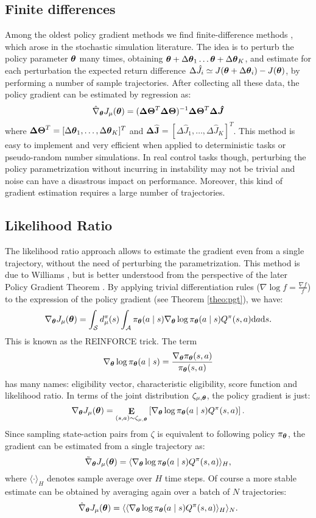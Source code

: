\subsection{Finite differences}
Among the oldest policy gradient methods we find finite-difference methods \cite{Glynn:1990:LRG:84537.84552}, which arose in the stochastic simulation literature. The idea is to perturb the policy parameter $\boldsymbol{\theta}$ many times, obtaining $\boldsymbol{\theta}+\Delta\boldsymbol{\theta}_1 \dots \boldsymbol{\theta}+\Delta\boldsymbol{\theta}_K$, and estimate for each perturbation the expected return difference $\Delta\hat{J}_i \simeq J(\boldsymbol{\theta}+\Delta\boldsymbol{\theta}_i) - J(\boldsymbol{\theta})$, by performing a number of sample trajectories. After collecting all these data, the policy gradient can be estimated by regression as:
\[
	\hat{\nabla}_{\boldsymbol{\theta}}J_{\mu}(\boldsymbol{\theta}) = (\boldsymbol{\Delta\Theta}^T\boldsymbol{\Delta\Theta})^{-1}\boldsymbol{\Delta\Theta}^T\boldsymbol{\Delta\hat{J}}
\]
where $\boldsymbol{\Delta\Theta}^T = [\Delta\boldsymbol{\theta}_1,\dots,\Delta\boldsymbol{\theta}_K]^T$ and $\boldsymbol{\Delta\hat{J}} = [\Delta\hat{J}_1,\dots,\Delta\hat{J}_K]^T$. This method is easy to implement and very efficient when applied to deterministic tasks or pseudo-random number simulations. In real control tasks though, perturbing the policy parametrization without incurring in instability may not be trivial and noise can have a disastrous impact on performance. Moreover, this kind of gradient estimation requires a large number of trajectories.

\subsection{Likelihood Ratio}\label{sec:likelihood_ratio}
The likelihood ratio approach allows to estimate the gradient even from a single trajectory, without the need of perturbing the parametrization. This method is due to Williams \cite{Williams1992}, but is better understood from the perspective of the later Policy Gradient Theorem \cite{Sutton1999a}.
By applying trivial differentiation rules ($\nabla\log f = \frac{\nabla f}{f}$) to the expression of the policy gradient (see Theorem \ref{theo:pgt}), we have:
\[
	\nabla_{\boldsymbol{\theta}}J_\mu(\boldsymbol{\theta}) = \int_{\mathcal{S}}d_{\mu}^{\pi}(s)
		\int_{\mathcal{A}}\pi_{\boldsymbol{\theta}}(a \mid s)\nabla_{\boldsymbol{\theta}}\log\pi_{\boldsymbol{\theta}}(a \mid s)
		Q^{\pi}(s,a)\mathrm{d}a\mathrm{d}s.
\]
This is known as the REINFORCE \cite{Williams1992} trick. The term
\[
	\nabla_{\boldsymbol{\theta}}\log\pi_{\boldsymbol{\theta}}(a \mid s) = \frac{\nabla_{\boldsymbol{\theta}}\pi_{\boldsymbol{\theta}}(s,a)}{\pi_{\boldsymbol{\theta}}(s,a)}
\]
has many names: eligibility vector, characteristic eligibility, score function and likelihood ratio.
In terms of the joint distribution $\zeta_{\mu,\boldsymbol{\theta}}$, the policy gradient is just:
\[
	\nabla_{\boldsymbol{\theta}}J_\mu(\boldsymbol{\theta}) = \mathop{\mathbf{E}}_{(s,a)\sim\zeta_{\mu,\boldsymbol{\theta}}}\left[\nabla_{\boldsymbol{\theta}}\log\pi_{\boldsymbol{\theta}}(a \mid s) Q^{\pi}(s,a)\right].
\]
Since sampling state-action pairs from $\zeta$ is equivalent to following policy $\pi_{\boldsymbol{\theta}}$, the gradient can be estimated from a single trajectory as:
\[
	\tilde{\nabla}_{\boldsymbol{\theta}}J_{\mu}(\boldsymbol{\theta}) = \langle\nabla_{\boldsymbol{\theta}}\log\pi_{\boldsymbol{\theta}}(a \mid s) Q^{\pi}(s,a)\rangle_H,
\]
where $\langle\cdot\rangle_H$ denotes sample average over $H$ time steps. Of course a more stable estimate can be obtained by averaging again over a batch of $N$ trajectories:
\[
	\hat{\nabla}_{\boldsymbol{\theta}}J_{\mu}(\boldsymbol{\theta}) = \langle\langle\nabla_{\boldsymbol{\theta}}\log\pi_{\boldsymbol{\theta}}(a \mid s) Q^{\pi}(s,a)\rangle_H\rangle_N.
\]

